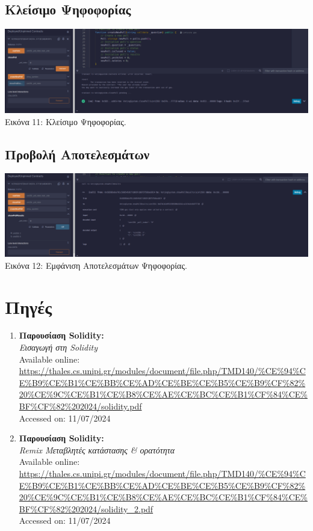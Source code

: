 \documentclass[12pt]{article}
\begin{document}
    \subsection{Κλείσιμο Ψηφοφορίας}
    
    \begin{center}
        \includegraphics[width=\linewidth, keepaspectratio]{images/ss_close_vote.png}
        Εικόνα 11: Κλείσιμο Ψηφοφορίας.
    \end{center}
    
    \subsection{Προβολή Αποτελεσμάτων}
    
    \begin{center}
        \includegraphics[width=\linewidth, keepaspectratio]{images/ss_show_poll_results.png}
        Εικόνα 12: Εμφάνιση Αποτελεσμάτων Ψηφοφορίας.
    \end{center}

\newpage

\section{Πηγές}

\begin{enumerate}
    \item \textbf{Παρουσίαση Solidity:} \\
    \textit{Εισαγωγή στη Solidity} \\
    Available online: \url{https://thales.cs.unipi.gr/modules/document/file.php/TMD140/%CE%94%CE%B9%CE%B1%CE%BB%CE%AD%CE%BE%CE%B5%CE%B9%CF%82%20%CE%9C%CE%B1%CE%B8%CE%AE%CE%BC%CE%B1%CF%84%CE%BF%CF%82%202024/solidity.pdf} \\
    Accessed on: 11/07/2024
    
    \item \textbf{Παρουσίαση Solidity:} \\
    \textit{Remix Μεταβλητές κατάστασης \& ορατότητα} \\
    Available online: \url{https://thales.cs.unipi.gr/modules/document/file.php/TMD140/%CE%94%CE%B9%CE%B1%CE%BB%CE%AD%CE%BE%CE%B5%CE%B9%CF%82%20%CE%9C%CE%B1%CE%B8%CE%AE%CE%BC%CE%B1%CF%84%CE%BF%CF%82%202024/solidity_2.pdf} \\
    Accessed on: 11/07/2024
\end{enumerate}
\end{document}
